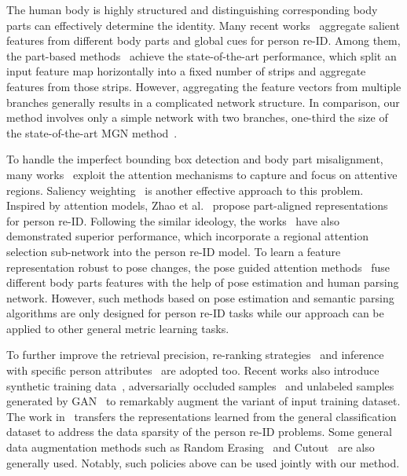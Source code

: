 \documentclass[10pt,twocolumn,letterpaper]{article}
\begin{document}
The human body is highly structured and distinguishing corresponding body parts can effectively determine the identity. Many recent works~\cite{liu2017end,sun2017beyond,ustinova2015bilinear,varior2016lstm,wang2018mgn,wei2017glad,yao2017deep,zhang2017alignedreid,zhao2017spindle} aggregate salient features from different body parts and global cues for person re-ID. Among them, the part-based methods~\cite{cheng2016person,sun2017beyond,wang2018mgn} achieve the state-of-the-art performance, which split an input feature map horizontally into a fixed number of strips and aggregate features from those strips. However, aggregating the feature vectors from multiple branches generally results in a complicated network structure.
In comparison, our method involves only a simple network with two branches, one-third the size of the state-of-the-art MGN method~\cite{wang2018mgn}.


To handle the imperfect bounding box detection and body part misalignment, many works~\cite{li2018harmonious,shen2018group,shen2015structure,si2018dualattention,zheng2015partial} exploit the attention mechanisms to capture and focus on attentive regions.
Saliency weighting~\cite{wang2014salincy,zhao2013unsupervise} is another effective approach to this problem.
Inspired by attention models, Zhao et al.~\cite{zhao2017deeply} propose part-aligned representations for person re-ID.
Following the similar ideology, the works~\cite{kim2018attention,lan2017align,li2017learning,liu2017hydraplus} have also demonstrated superior performance, which incorporate a regional attention selection sub-network into the person re-ID model.
To learn a feature representation robust to pose changes, the pose guided attention methods~\cite{kumar2017pose,su2017pose,zheng2017pose} fuse different body parts features with the help of pose estimation and human parsing network.
However, such methods based on pose estimation and semantic parsing algorithms are only designed for person re-ID tasks while our approach can be applied to other general metric learning tasks.


To further improve the retrieval precision, re-ranking strategies~\cite{bai2017reid,zhong2017re} and inference with specific person attributes~\cite{schumann2017attribute} are adopted too.
Recent works also introduce synthetic training data~\cite{barbosa2017synthetic}, adversarially occluded samples~\cite{huang2018adversarial} and unlabeled samples generated by GAN~\cite{zheng2017unlabeled} to remarkably augment the variant of input training dataset.
The work in~\cite{geng2016deep} transfers the representations learned from the general classification dataset to address the data sparsity of the person re-ID problems.
Some general data augmentation methods such as Random Erasing~\cite{zhong2017re} and Cutout~\cite{devries2017improved} are also generally used.
Notably, such policies above can be used jointly with our method. 
\end{document}
